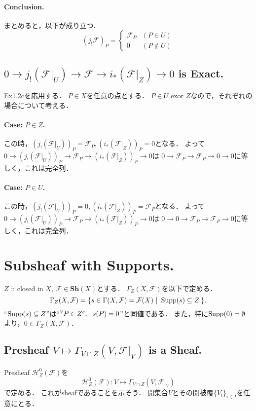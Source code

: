 \documentclass[a4paper]{jsarticle}
\newcommand{\shF}{\mathcal{F}}
\newcommand{\Sh}{\mathbf{Sh}}
\begin{document}
    \paragraph{Conclusion.}
    まとめると，以下が成り立つ．
    \[
        (j_! \shF)_P=
        \begin{cases}{}
            \shF_P & (P \in U) \\
            0 & (P \not \in U)
        \end{cases}
    \]

    \subsection{$0 \to j_!(\shF|_U) \to \shF \to i_*(\shF|_Z) \to 0$ is Exact.}
    Ex1.2cを応用する．
    $P \in X$を任意の点とする．
    $P \in U \text{ exor } Z$なので，それぞれの場合について考える．

    \paragraph{Case: $P \in Z$.}
    この時，$(j_!(\shF|_U))_P=\shF_P, (i_*(\shF|_Z))_P=0$となる．
    よって$0 \to (j_!(\shF|_U))_P \to \shF_P \to (i_*(\shF|_Z))_P \to 0$は
    $0 \to \shF_P \to \shF_P \to 0 \to 0$に等しく，これは完全列．

    \paragraph{Case: $P \in U$.}
    この時，$(j_!(\shF|_U))_P=0, (i_*(\shF|_Z))_P=\shF_P$となる．
    よって$0 \to (j_!(\shF|_U))_P \to \shF_P \to (i_*(\shF|_Z))_P \to 0$は
    $0 \to 0 \to \shF_P \to \shF_P \to 0$に等しく，これは完全列．

\section{Subsheaf with Supports.} %
    $Z$ :: closed in $X$, $\shF \in \Sh(X)$とする．
    $\Gamma_Z(X, \shF)$を以下で定める．
    \[ \Gamma_Z(X, \shF)=\{ s \in \Gamma(X, \shF)=\shF(X) ~|~ \Supp(s) \subseteq Z. \}. \]
    ``$\operatorname{Supp}(s) \subseteq Z$''は``${}^{\forall} P \in Z^c,~~ s(P)=0$''と同値である．
    また，特に$\operatorname{Supp}(0)=\emptyset$より，$0 \in \Gamma_Z(X, \shF)$．

    \subsection{Presheaf $V \mapsto \Gamma_{V \cap Z}(V, \shF|_V)$ is a Sheaf.}
    Presheaf $\mathscr{H}_Z^0(\shF)$を
    \[ \mathscr{H}_Z^0(\shF): V \mapsto \Gamma_{V \cap Z}(V, \shF|_V) \]
    で定める．
    これがsheafであることを示そう．
    開集合$V$とその開被覆$\{V_i\}_{i \in I}$を任意にとる．
\end{document}
